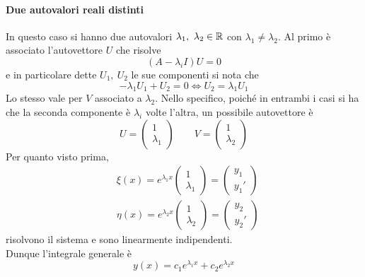 \paragraph{Due autovalori reali distinti} In questo caso si hanno due autovalori $\lambda_1,\ \lambda_2 \in \mathbb{R}$ con $\lambda_1\neq \lambda_2$. Al primo è associato l'autovettore $U$ che risolve
\begin{equation}
    (A- \lambda_i I)U=0
\end{equation}
e in particolare dette $U_1,\ U_2$ le sue componenti si nota che
\begin{equation}
    -\lambda_1 U_1 + U_2 =0 \iff U_2 = \lambda_1 U_1
\end{equation}
Lo stesso vale per $V$ associato a $\lambda_2$. Nello specifico, poiché in entrambi i casi si ha che la seconda componente è $\lambda_i$ volte l'altra, un possibile autovettore è
\begin{equation}
    U=\begin{pmatrix}
        1\\
        \lambda_1
    \end{pmatrix} \qquad
    V=\begin{pmatrix}
        1\\
        \lambda_2
    \end{pmatrix}
\end{equation}
Per quanto visto prima, 
\begin{align}
    &\xi(x)=e^{\lambda_1 x} \begin{pmatrix}
        1\\
        \lambda_1
    \end{pmatrix}=\begin{pmatrix}
        y_1\\
        y_1'
    \end{pmatrix}\\ 
    &\eta(x)= e^{\lambda_2 x} \begin{pmatrix}
        1\\
        \lambda_2
    \end{pmatrix}=\begin{pmatrix}
        y_2\\
        y_2'
        \end{pmatrix}
\end{align}
risolvono il sistema e sono linearmente indipendenti.\\
Dunque l'integrale generale è \begin{equation}
    y(x)=c_1e^{\lambda_1 x} + c_2 e^{\lambda_2 x}
\end{equation}
